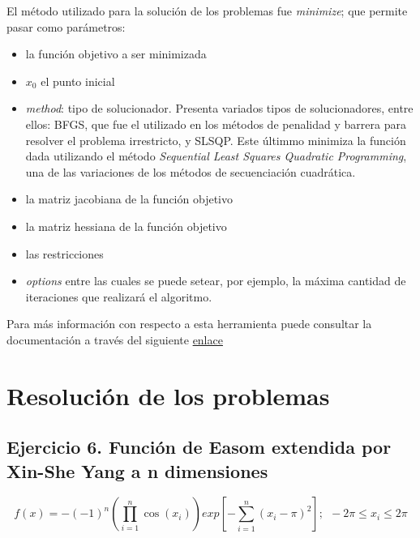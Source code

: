 \documentclass[titlepage, 11pt]{scrartcl}
\begin{document}
	El método utilizado para la solución de los problemas fue \textit{minimize}; que permite pasar como parámetros:
	\begin{itemize}
		\item la función objetivo a ser minimizada
		\item $x_0$ el punto inicial
		\item \textit{method}: tipo de solucionador. Presenta variados tipos de solucionadores, entre ellos: BFGS, que fue el utilizado en los métodos de penalidad y barrera para resolver el problema irrestricto, y SLSQP. Este últimmo minimiza la función dada utilizando el método \textit{Sequential Least Squares Quadratic Programming}, una de las variaciones de los métodos de secuenciación cuadrática.
		\item la matriz jacobiana de la función objetivo
		\item la matriz hessiana de la función objetivo
		\item las restricciones
		\item \textit{options} entre las cuales se puede setear, por ejemplo, la máxima cantidad de iteraciones que realizará el algoritmo.
	\end{itemize}
	Para más información con respecto a esta herramienta puede consultar la documentación a través del siguiente \href{https://docs.scipy.org/doc/scipy/reference/generated/scipy.optimize.minimize.html}{enlace}
	
	
	\section{Resolución de los problemas}
	\subsection{Ejercicio 6. Función de Easom extendida por Xin-She Yang a n dimensiones}
	\begin{equation*}
		f(x) = -(-1)^n(\prod_{i = 1}^{n} \cos(x_i))exp[-\sum_{i = 1}^{n}(x_i - \pi)^2] ; \ \ -2\pi \leq x_i \leq 2\pi
	\end{equation*}
\end{document}
